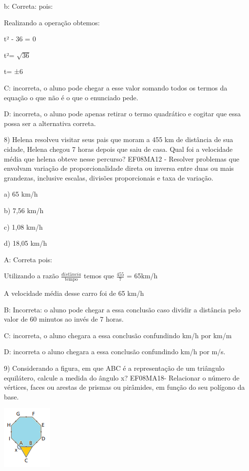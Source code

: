 {b: Correta: pois:

Realizando a operação obtemos:

t² - 36 = 0

t²= \(\sqrt{36}\)

t= ±6

C: incorreta, o aluno pode chegar a esse valor somando todos os termos
da equação o que não é o que o enunciado pede.

D: incorreta, o aluno pode apenas retirar o termo quadrático e cogitar
que essa possa ser a alternativa correta.

8) Helena resolveu visitar seus pais que moram a 455 km de distância de
sua cidade, Helena chegou 7 horas depois que saiu de casa. Qual foi a
velocidade média que helena obteve nesse percurso? EF08MA12 - Resolver
problemas que envolvam variação de proporcionalidade direta ou inversa
entre duas ou mais grandezas, inclusive escalas, divisões proporcionais
e taxa de variação.

a) 65 km/h

b) 7,56 km/h

c) 1,08 km/h

d) 18,05 km/h

A: Correta pois:

Utilizando a razão \(\frac{distância}{\text{tempo}}\) temos que
\(\frac{455}{7}\) = 65km/h

A velocidade média desse carro foi de 65 km/h

B: Incorreta: o aluno pode chegar a essa conclusão caso dividir a
distância pelo valor de 60 minutos ao invés de 7 horas.

C: incorreta, o aluno chegara a essa conclusão confundindo km/h por km/m

D: incorreta o aluno chegara a essa conclusão confundindo km/h por m/s.

9) Considerando a figura, em que ABC é a representação de um triângulo
equilátero, calcule a medida do ângulo x? EF08MA18- Relacionar o número
de vértices, faces ou arestas de prismas ou pirâmides, em função do seu
polígono da base.

\includegraphics[width=0.98958in,height=1.26042in]{./imgSAEB_8_MAT/media/image56.png}

}

